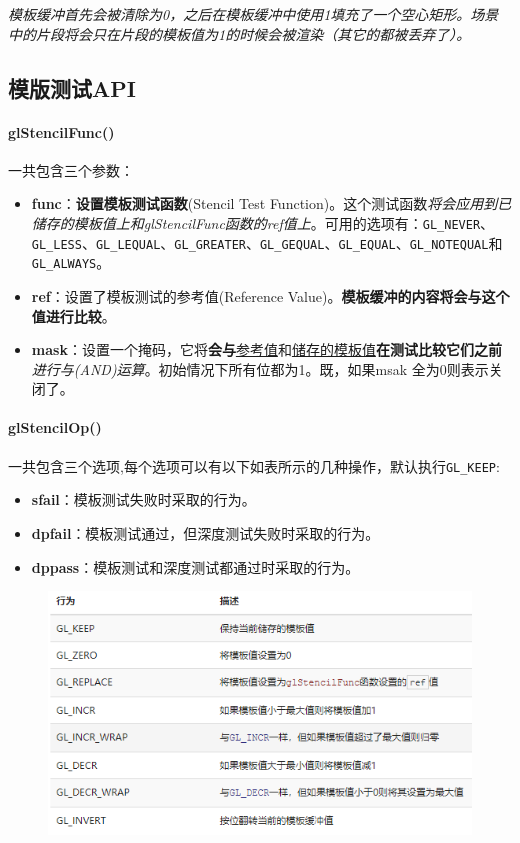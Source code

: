 \documentclass[UTF8,a4paper,12pt]{ctexbook}
\begin{document}
		\textit{模板缓冲首先会被清除为0，之后在模板缓冲中使用1填充了一个空心矩形。场景中的片段将会只在片段的模板值为1的时候会被渲染（其它的都被丢弃了）。}
		
		\subsection{模版测试API}
			\paragraph{glStencilFunc()}
				一共包含三个参数：
				
				\begin{itemize}
					\item \textbf{func}：\textbf{设置模板测试函数}(Stencil Test Function)。这个测试函数\textit{将会应用到已储存的模板值上和glStencilFunc函数的ref值上}。可用的选项有：\verb|GL_NEVER|、\verb|GL_LESS|、\verb|GL_LEQUAL|、\verb|GL_GREATER|、\verb|GL_GEQUAL|、\verb|GL_EQUAL|、\verb|GL_NOTEQUAL|和\verb|GL_ALWAYS|。
					\item \textbf{ref}：设置了模板测试的参考值(Reference Value)。\textbf{模板缓冲的内容将会与这个值进行比较}。
					\item \textbf{mask}：设置一个掩码，它将\textbf{会与}\underline{参考值}和\underline{储存的模板值}\textbf{在测试比较它们之前}\textit{进行与(AND)运算}。初始情况下所有位都为1。既，如果msak 全为0则表示关闭了。
				\end{itemize}
				
			\paragraph{glStencilOp()}
				一共包含三个选项,每个选项可以有以下如表所示的几种操作，默认执行\verb|GL_KEEP|:
				
				\begin{itemize}
					\item \textbf{sfail}：模板测试失败时采取的行为。
					\item \textbf{dpfail}：模板测试通过，但深度测试失败时采取的行为。
					\item \textbf{dppass}：模板测试和深度测试都通过时采取的行为。
				\end{itemize}	
				
				\begin{figure}[H]
					\centering
					\includegraphics[width=.9\linewidth]{stencilAct}
				\end{figure}	
		
\end{document}
